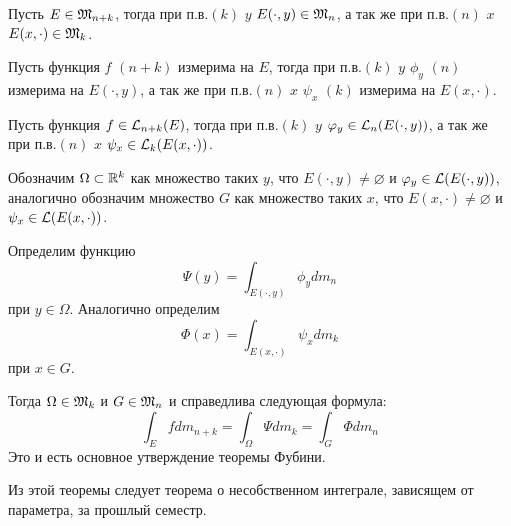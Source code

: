 \documentclass[main]{subfiles}
\begin{document}
\begin{proposition}
    Пусть $E \in \mathfrak{M}_{n+k}$, тогда при п.в.$(k)$ $y$ $E(\cdot, y) \in \mathfrak{M}_n$, а так же при п.в.$(n)$ $x$ $E(x, \cdot) \in \mathfrak{M}_k$.
\end{proposition}

\begin{proposition}
    Пусть функция $f$ $(n+k)$ измерима на $E$, тогда при п.в.$(k)$ $y$ $\phi_y$ $(n)$ измерима на $E(\cdot, y)$, а так же при п.в.$(n)$ $x$ $\psi_x$ $(k)$ измерима на $E(x, \cdot)$.
\end{proposition}

\begin{proposition}
    Пусть функция $f \in \mathcal{L}_{n+k}(E)$, тогда при п.в.$(k)$ $y$ $\varphi_y \in \mathcal{L}_n(E(\cdot, y))$, а так же при п.в.$(n)$ $x$ $\psi_x \in \mathcal{L}_k(E(x, \cdot))$.
\end{proposition}

Обозначим $\Omega \subset \mathbb{R}^k$ как множество таких $y$, что $E(\cdot, y) \neq \varnothing$ и $\varphi_y \in \mathcal{L}(E(\cdot, y))$, аналогично обозначим множество $G$ как множество таких $x$, что $E(x, \cdot) \neq \varnothing$ и $\psi_x \in \mathcal{L}(E(x, \cdot))$.

Определим функцию
\[\Psi (y) = \int_{E(\cdot, y)} \phi_y dm_n\]
при $y \in \Omega$.
Аналогично определим
\[\Phi(x) = \int_{E(x, \cdot)} \psi_x dm_k\]
при $x \in G$.

Тогда $\Omega \in \mathfrak{M}_k$ и $G \in \mathfrak{M}_n$ и справедлива следующая формула:
\[
    \int_E f dm_{n+k} = \int_\Omega \Psi dm_k = \int_G \Phi dm_n
\]
Это и есть основное утверждение теоремы Фубини.

Из этой теоремы следует теорема о несобственном интеграле, зависящем от параметра, за прошлый семестр.
\end{document}
